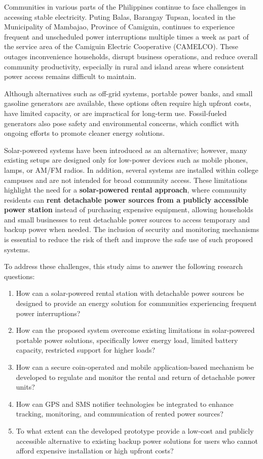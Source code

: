 {Communities in various parts of the Philippines continue to face challenges in accessing stable electricity. Puting Balas, Barangay Tupsan, located in the Municipality of Mambajao, Province of Camiguin, continues to experience frequent and unscheduled power interruptions multiple times a week as part of the service area of the Camiguin Electric Cooperative (CAMELCO). These outages inconvenience households, disrupt business operations, and reduce overall community productivity, especially in rural and island areas where consistent power access remains difficult to maintain.

Although alternatives such as off-grid systems, portable power banks, and small gasoline generators are available, these options often require high upfront costs, have limited capacity, or are impractical for long-term use. Fossil-fueled generators also pose safety and environmental concerns, which conflict with ongoing efforts to promote cleaner energy solutions.

Solar-powered systems have been introduced as an alternative; however, many existing setups are designed only for low-power devices such as mobile phones, lamps, or AM/FM radios. In addition, several systems are installed within college campuses and are not intended for broad community access. These limitations highlight the need for a \textbf{solar-powered rental approach}, where community residents can \textbf{rent detachable power sources from a publicly accessible power station} instead of purchasing expensive equipment, allowing households and small businesses to rent detachable power sources to access temporary and backup power when needed. The inclusion of security and monitoring mechanisms is essential to reduce the risk of theft and improve the safe use of such proposed systems.


To address these challenges, this study aims to answer the following research questions:

\begin{enumerate}
	\item How can a solar-powered rental station with detachable power sources be designed to provide an energy solution for communities experiencing frequent power interruptions?
	\item How can the proposed system overcome existing limitations in solar-powered portable power solutions, specifically lower energy load, limited battery capacity, restricted support for higher loads?
	\item How can a secure coin-operated and mobile application-based mechanism be developed to regulate and monitor the rental and return of detachable power units?
	\item How can GPS and SMS notifier technologies be integrated to enhance tracking, monitoring, and communication of rented power sources?
	\item To what extent can the developed prototype provide a low-cost and publicly accessible alternative to existing backup power solutions for users who cannot afford expensive installation or high upfront costs?
\end{enumerate}


}
